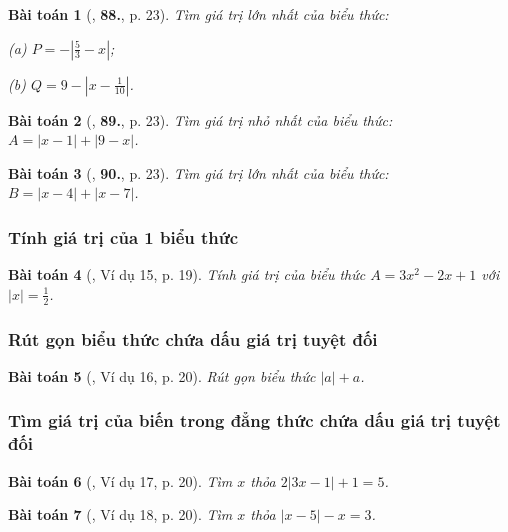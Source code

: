 \documentclass{article}
\numberwithin{equation}{section}
\newtheorem{baitoan}{Bài toán}
\begin{document}
\begin{baitoan}[\cite{Tuyen_Toan_7}, \textbf{88.}, p. 23]
	Tìm giá trị lớn nhất của biểu thức:
	\begin{enumerate*}
		\item[(a)] $P = -\left|\frac{5}{3} - x\right|$;
		\item[(b)] $Q = 9 - \left|x - \frac{1}{10}\right|$.
	\end{enumerate*}
\end{baitoan}

\begin{baitoan}[\cite{Tuyen_Toan_7}, \textbf{89.}, p. 23]
	Tìm giá trị nhỏ nhất của biểu thức: $A = |x - 1| + |9 - x|$.
\end{baitoan}

\begin{baitoan}[\cite{Tuyen_Toan_7}, \textbf{90.}, p. 23]
	Tìm giá trị lớn nhất của biểu thức: $B = |x - 4| + |x - 7|$.
\end{baitoan}

\subsubsection{Tính giá trị của 1 biểu thức}

\begin{baitoan}[\cite{Binh_Toan_7_tap_1}, Ví dụ 15, p. 19]
	Tính giá trị của biểu thức $A = 3x^2 - 2x + 1$ với $|x| = \frac{1}{2}$.
\end{baitoan}

\subsubsection{Rút gọn biểu thức chứa dấu giá trị tuyệt đối}

\begin{baitoan}[\cite{Binh_Toan_7_tap_1}, Ví dụ 16, p. 20]
	Rút gọn biểu thức $|a| + a$.
\end{baitoan}

\subsubsection{Tìm giá trị của biến trong đẳng thức chứa dấu giá trị tuyệt đối}

\begin{baitoan}[\cite{Binh_Toan_7_tap_1}, Ví dụ 17, p. 20]
	Tìm $x$ thỏa $2|3x - 1| + 1 = 5$.
\end{baitoan}

\begin{baitoan}[\cite{Binh_Toan_7_tap_1}, Ví dụ 18, p. 20]
	Tìm $x$ thỏa $|x - 5| - x = 3$.
\end{baitoan}
\end{document}
